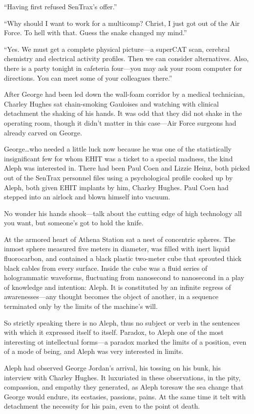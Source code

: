``Having first refused SenTrax's offer.''

``Why should I want to work for a multicomp? Christ, I just got out of the Air Force. To hell with that. Guess the snake changed my mind.''

``Yes. We must get a complete physical picture—a superCAT scan, cerebral chemistry and electrical activity profiles. Then we can consider alternatives. Also, there is a party tonight in cafeteria four---you may ask your room computer for directions. You can meet some of your colleagues there.''

After George had been led down the wall-foam corridor by a medical technician, Charley Hughes sat chain-smoking Gauloises and watching with clinical detachment the shaking of his hands. It was odd that they did not shake in the operating room, though it didn't matter in this case---Air Force surgeons had already carved on George.

George\ldots who needed a little luck now because he was one of the statistically insignificant few for whom EHIT was a ticket to a special madness, the kind Aleph was interested in. There had been Paul Coen and Lizzie Heinz, both picked out of the SenTrax personnel files using a psychological profile cooked up by Aleph, both given EHIT implants by him, Charley Hughes. Paul Coen had stepped into an airlock and blown himself into vacuum.

No wonder his hands shook—talk about the cutting edge of high technology all you want, but someone's got to hold the knife.

At the armored heart of Athena Station sat a nest of concentric spheres. The inmost sphere measured five meters in diameter, was filled with inert liquid fluorocarbon, and contained a black plastic two-meter cube that sprouted thick black cables from every surface. Inside the cube was a fluid series of hologrammatic waveforms, fluctuating from nanosecond to nanosecond in a play of knowledge and intention: Aleph. It is constituted by an infinite regress of awarenesses—any thought becomes the object of another, in a sequence terminated only by the limits of the machine's will.

So strictly speaking there is no Aleph, thus no subject or verb in the sentences with which it expressed itself to itself. Paradox, to Aleph one of the most interesting ot intellectual forms—a paradox marked the limits of a position, even of a mode of being, and Aleph was very interested in limits.

Aleph had observed George Jordan's arrival, his tossing on his bunk, his interview with Charley Hughes. It luxuriated in these observations, in the pity, compassion, and empathy they generated, as Aleph toresaw the sea change that George would endure, its ecstasies, passions, pains. At the same time it telt with detachment the necessity for his pain, even to the point ot death.

